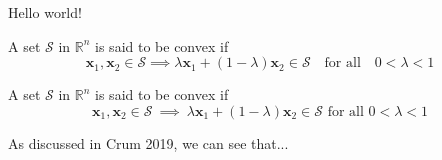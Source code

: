 \documentclass{article}
\begin{document}
Hello world!

A set \( \mathcal{S} \) in \( \mathbb{R}^n \) is said to be convex if
\[ \mathbf{x}_1, \mathbf{x}_2 \in \mathcal{S} \implies \lambda \mathbf{x}_1 +
(1-\lambda) \mathbf{x}_2 \in \mathcal{S} \text{~~~for all~~~} 0 < \lambda < 1 \]

\newcommand{\y}{\lambda}
\newcommand{\Rn}{\mathbb{R}^n}
\newcommand{\Set}{\mathcal{S}}
\newcommand{\x}{\mathbf{x}}
\newcommand{\tx}[1]{\text{#1}}
\newcommand{\imps}{~\implies~}

A set $\Set$ in $\Rn$ is said to be convex if \[
    \x_1, \x_2 \in \Set \imps \y\x_1 + (1 - \y) \x_2
      \in \Set \tx{ for all } 0 < \y < 1
\]

% 

As discussed in Crum 2019, we can see that...





\end{document}
